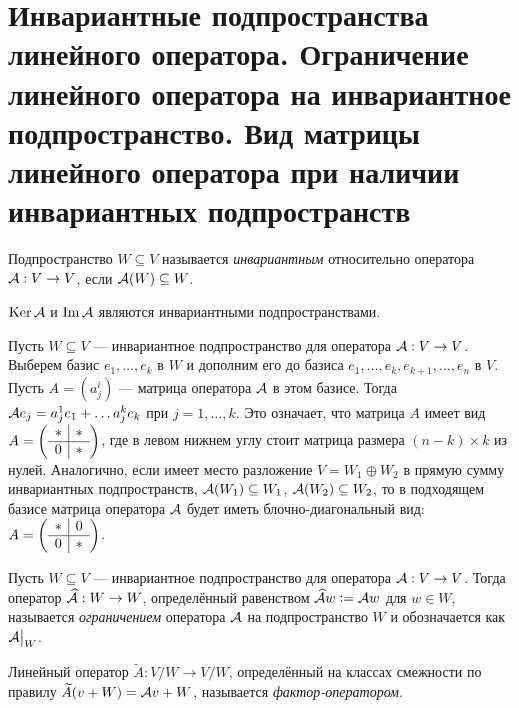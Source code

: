 \section{Инвариантные подпространства линейного оператора. Ограничение линейного оператора на инвариантное подпространство. Вид матрицы линейного оператора при наличии инвариантных подпространств}

\begin{definition}
    Подпространство $W \subseteq V$ называется \textit{инвариантным} относительно оператора $\mathcal{A}: V \to V$, если $\mathcal{A}(W) \subseteq W$.
\end{definition}

\begin{example}
    $\operatorname{Ker}\mathcal{A}$ и $\operatorname{Im}\mathcal{A}$ являются инвариантными подпространствами. 
\end{example}

Пусть $W \subseteq V$ --- инвариантное подпространство для оператора $\mathcal{A}: V \to V$. Выберем базис $e_1, \ldots, e_k$ в $W$ и дополним его до базиса $e_1, \ldots, e_k, e_{k + 1}, \ldots, e_n$ в $V$. Пусть $A = (a^i_j)$ --- матрица оператора $\mathcal{A}$ в этом базисе. Тогда $\mathcal{A} e_j = a^1_je_1 + \ldots a^k_je_k$ при $j = 1, \ldots, k$. Это означает, что матрица $A$ имеет вид
$
A =
\left(\begin{array}{c | c}
    \ast & \ast\\
    \hline
    0 & \ast
\end{array}
\right)
$, где в левом нижнем углу стоит матрица размера $(n - k) \times k$ из нулей. Аналогично, если имеет место разложение $V = W_1 \oplus W_2$ в прямую сумму инвариантных подпространств, $\mathcal{A}(W_1) \subseteq W_1$, $\mathcal{A}(W_2) \subseteq W_2$, то в подходящем базисе матрица оператора $\mathcal{A}$ будет иметь блочно-диагональный вид:
$
A =
\left(\begin{array}{c | c}
    \ast & 0\\
    \hline
    0 & \ast
\end{array}
\right)
$.

\begin{definition}
    Пусть $W \subseteq V$ --- инвариантное подпространство для оператора $\mathcal{A}: V \to V$. Тогда оператор $\widehat{\mathcal{A}}: W \to W$, определённый равенством $\widehat{\mathcal{A}}w \vcentcolon = \mathcal{A} w$ для $w \in W$, называется \textit{ограничением} оператора $\mathcal{A}$ на подпространство $W$ и обозначается как $\mathcal{A}\big|_W$.
\end{definition}

\begin{definition}
    Линейный оператор $\widetilde{A}: V / W \to V / W$, определённый на классах смежности по правилу $\widetilde{A}(v + W) = \mathcal{A} v + W$, называется \textit{фактор-оператором}.
\end{definition}

